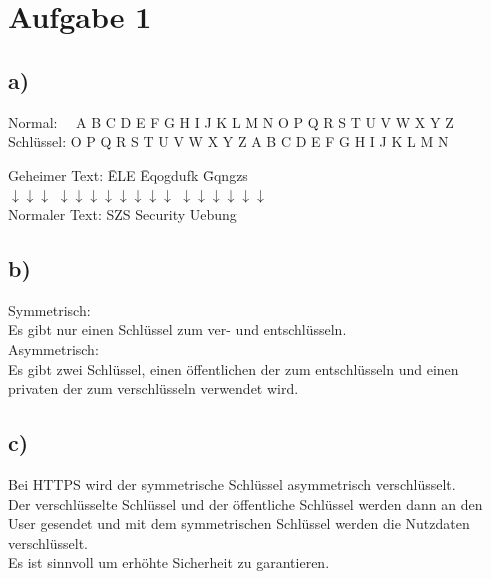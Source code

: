 \section*{Aufgabe 1}
	\subsection*{a)}
		Normal: \ \ A B C D E F G H I J K L M N O P Q R S T U V W X Y Z\\
		Schlüssel: O P Q R S T U V W X Y Z A B C D E F G H I J K L M N\\
		
		\begin{tabbing}
			Geheimer Text: \=ELE \=Eqogdufk \=Gqngzs\\
			\>$\downarrow$$\downarrow$$\downarrow$
			\>$\downarrow$$\downarrow$$\downarrow$$\downarrow$$\downarrow$$\downarrow$$\downarrow$$\downarrow$
			\>$\downarrow$$\downarrow$$\downarrow$$\downarrow$$\downarrow$$\downarrow$\\
			Normaler Text: \>SZS \>Security \>Uebung
		\end{tabbing}
	
	\subsection*{b)}
		Symmetrisch:\\
		Es gibt nur einen Schlüssel zum ver- und entschlüsseln.\\
		
		Asymmetrisch:\\
		Es gibt zwei Schlüssel, einen öffentlichen der zum entschlüsseln und einen privaten der zum verschlüsseln verwendet wird.
		
	\subsection*{c)}
		Bei HTTPS wird der symmetrische Schlüssel asymmetrisch verschlüsselt.\\
		Der verschlüsselte Schlüssel und der öffentliche Schlüssel werden dann an den User gesendet und mit dem symmetrischen Schlüssel werden die Nutzdaten verschlüsselt.\\
		Es ist sinnvoll um erhöhte Sicherheit zu garantieren. 